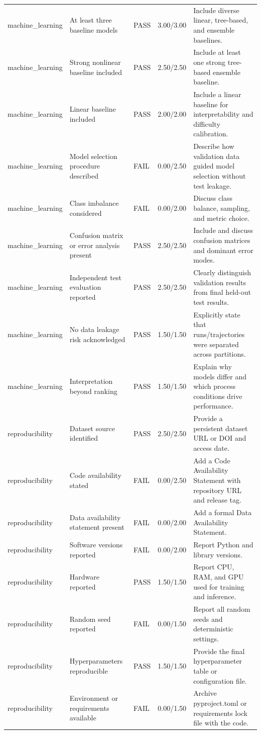 \begin{longtable}{p{2.6cm}p{5.2cm}p{1.5cm}p{1.4cm}p{4.8cm}}
machine\_learning & At least three baseline models & PASS & 3.00/3.00 & Include diverse linear, tree-based, and ensemble baselines. \\
machine\_learning & Strong nonlinear baseline included & PASS & 2.50/2.50 & Include at least one strong tree-based ensemble baseline. \\
machine\_learning & Linear baseline included & PASS & 2.00/2.00 & Include a linear baseline for interpretability and difficulty calibration. \\
machine\_learning & Model selection procedure described & FAIL & 0.00/2.50 & Describe how validation data guided model selection without test leakage. \\
machine\_learning & Class imbalance considered & FAIL & 0.00/2.00 & Discuss class balance, sampling, and metric choice. \\
machine\_learning & Confusion matrix or error analysis present & PASS & 2.50/2.50 & Include and discuss confusion matrices and dominant error modes. \\
machine\_learning & Independent test evaluation reported & PASS & 2.50/2.50 & Clearly distinguish validation results from final held-out test results. \\
machine\_learning & No data leakage risk acknowledged & PASS & 1.50/1.50 & Explicitly state that runs/trajectories were separated across partitions. \\
machine\_learning & Interpretation beyond ranking & PASS & 1.50/1.50 & Explain why models differ and which process conditions drive performance. \\
reproducibility & Dataset source identified & PASS & 2.50/2.50 & Provide a persistent dataset URL or DOI and access date. \\
reproducibility & Code availability stated & FAIL & 0.00/2.50 & Add a Code Availability Statement with repository URL and release tag. \\
reproducibility & Data availability statement present & FAIL & 0.00/2.00 & Add a formal Data Availability Statement. \\
reproducibility & Software versions reported & FAIL & 0.00/2.00 & Report Python and library versions. \\
reproducibility & Hardware reported & PASS & 1.50/1.50 & Report CPU, RAM, and GPU used for training and inference. \\
reproducibility & Random seed reported & FAIL & 0.00/1.50 & Report all random seeds and deterministic settings. \\
reproducibility & Hyperparameters reproducible & PASS & 1.50/1.50 & Provide the final hyperparameter table or configuration file. \\
reproducibility & Environment or requirements available & FAIL & 0.00/1.50 & Archive pyproject.toml or requirements lock file with the code. \\
\bottomrule
\end{longtable}
